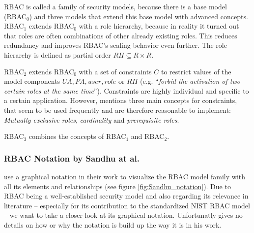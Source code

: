 \documentclass[twoside, openright, 12pt]{book}
\begin{document}
\noindent
RBAC is called a family of security models, because there is a base model (RBAC$_0$) and three models that extend this base model with advanced concepts.
RBAC$_1$ extends RBAC$_0$ with a role hierarchy, because in reality it turned out that roles are often combinations of other already existing roles.
This reduces redundancy and improves RBAC's scaling behavior even further.
The role hierarchy is defined as partial order $\mathit{RH} \subseteq R \times R$.%

RBAC$_2$ extends RBAC$_0$ with a set of constraints $C$ to restrict values of the model components $\mathit{UA}, \mathit{PA}, \mathit{user}, \mathit{role}$ or $\mathit{RH}$ (e.g. ``\textit{forbid the activation of two certain roles at the same time}'').
Constraints are highly individual and specific to a certain application.
However, \cite{Sandhu96} mentions three main concepts for constraints, that seem to be used frequently and are therefore reasonable to implement: \textit{Mutually exclusive roles}, \textit{cardinality} and \textit{prerequisite roles}.

RBAC$_3$ combines the concepts of RBAC$_1$ and RBAC$_2$.





\subsubsection{RBAC Notation by Sandhu at al.}
\label{RBAC_notation}
\cite{Sandhu96} use a graphical notation in their work to visualize the RBAC model family with all its elements and relationships (see figure \ref{fig:Sandhu_notation}).
Due to RBAC being a well-established security model and also regarding its relevance in literature -- especially for its contribution to the standardized NIST RBAC model \citep{RBACNIST} -- we want to take a closer look at its graphical notation.
Unfortunatly \cite{Sandhu96} gives no details on how or why the notation is build up the way it is in his work.
\end{document}
